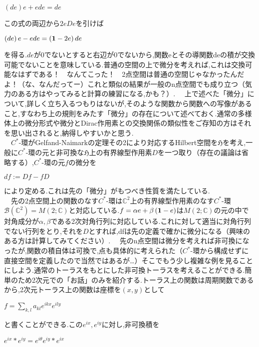 \begin{center}
$\left(de\right)e+ede=de$
\end{center}
この式の両辺から$2eDe$を引けば
\begin{center}
$\left(de\right)e-ede=\left({\bf 1}-2e\right)de$
\end{center}
を得る.$de$が0でないとすると右辺が$0$でないから,関数eとその導関数deの積が交換可能でないことを意味している.普通の空間の上で微分を考えれば,これは交換可能なはずである！　なんてこった！　2点空間は普通の空間じゃなかったんだよ！（な、なんだってー）これと類似の結果が一般のn点空間でも成り立つ（気力のある方はやってみると計算の練習になる,かも？）.
　上で述べた「微分」について,詳しく立ち入るつもりはないが,そのような関数から関数への写像があること,すなわち上の規則をみたす「微分」の存在について述べておく.通常の多様体上の微分形式や微分とDirac作用素との交換関係の類似性をご存知の方はそれを思い出されると,納得しやすいかと思う.\\
　$C^*$-環がGelfand-Naimarkの定理その2により対応するHilbert空間を$\mathfrak{H}$を考え,一般に$C^*$-環の元と非可換な$\mathfrak{H}$上の有界線型作用素$D$を一つ取り（存在の議論は省略する）,$C^*$-環の元$f$の微分を
\begin{center}
$df:=Df-fD$
\end{center}
により定める.これは先の「微分」がもつべき性質を満たしている.\\
　先の2点空間上の関数のなす$C^*$-環は$\mathbb{C}^2$上の有界線型作用素のなす$C^*$-環$\mathcal{B}\left(\mathbb{C}^2\right)=M\left(2;\mathbb{C}\right)$と対応している.$f=\alpha e+\beta \left({\bf 1}-e\right)$は$M\left(2;\mathbb{C}\right)$の元の中で対角成分が$\alpha,\beta$である2次対角行列に対応している.これに対して適当に対角行列でない行列をとり,それを$D$とすれば,dfは先の定義で確かに微分になる（興味のある方は計算してみてください）.
　先のn点空間は微分を考えれば非可換になったが,関数の積自体は可換で,点も具体的に考えられた（$C^*$-環から構成せずに直接空間を定義したので当然ではあるが…）そこでもう少し複雑な例を見ることにしよう.通常のトーラスをもとにした非可換トーラスを考えることができる.簡単のため2次元での「お話」のみを紹介する.トーラス上の関数は周期関数であるから,2次元トーラス上の関数は座標を$\left(x,y\right)$として
\begin{center}
$f=\sum_{k,l} a_{kl}e^{ikx}e^{ily}$
\end{center}
と書くことができる.この$e^{ix},e^{iy}$に対し,非可換積を
\begin{center}
$e^{ix}*e^{iy}=e^{i\theta}e^{iy}*e^{ix}$
\end{center}
